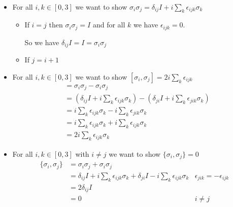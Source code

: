 ~

\begin{itemize}
  \item For all $i, k \in [0, 3]$ we want to show
    $\sigma_i \sigma_j = \delta_{ij} I + i \sum_k \epsilon_{ijk} \sigma_k$

    \begin{itemize}
      \item If $i=j$ then $\sigma_i \sigma_j = I$ and for all $k$ we have
        $\epsilon_{ijk} = 0$.

        So we have $\delta_{ij} I = I = \sigma_i \sigma_j$
      \item If $j = i + 1$
    \end{itemize}

  \item For all $i, k \in [0, 3]$ we want to show $[\sigma_i, \sigma_j] = 
    2i \sum_k \epsilon_{ijk}$
    \begin{align*}
      [\sigma_i, \sigma_j] &= \sigma_i \sigma_j - \sigma_i \sigma_j \\
      &= (\delta_{ij} I + i \sum_k \epsilon_{ijk} \sigma_k) -
         (\delta_{ji} I + i \sum_k \epsilon_{jik} \sigma_k) \\
      &= i \sum_k \epsilon_{ijk} \sigma_k - i \sum_k \epsilon_{jik} \sigma_k \\
      &= i \sum_k \epsilon_{ijk} \sigma_k + i \sum_k \epsilon_{ijk} \sigma_k \\
      &= 2i \sum_k \epsilon_{ijk} \sigma_k
    \end{align*}
  \item For all $i, k \in [0, 3]$ with $i\not = j$ we want to show $\{\sigma_i, \sigma_j\} = 0$
    \begin{align*}
      \{\sigma_i, \sigma_j\} &= \sigma_i \sigma_j + \sigma_i \sigma_j \\
      &= \delta_{ij} I + i \sum_k \epsilon_{ijk} \sigma_k +
         \delta_{ji} I - i \sum_k \epsilon_{ijk} \sigma_k & \epsilon_{jik} =
         -\epsilon_{ijk}\\
      &= 2 \delta_{ij} I \\
      &= 0 & i \not = j
    \end{align*}
\end{itemize}


